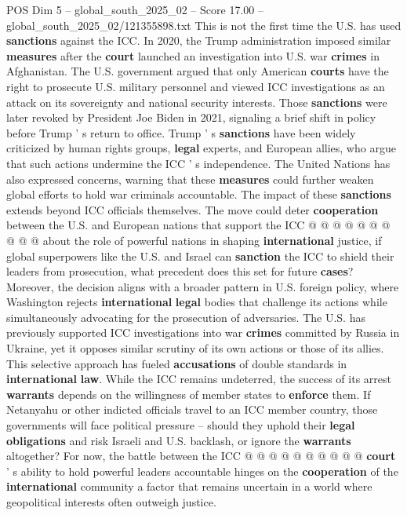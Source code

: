 \begin{textsample}{POS Dim 5 – global\_south\_2025\_02 – Score 17.00 – global\_south\_2025\_02/121355898.txt}
This is not the first time the U.S. has used \textbf{sanctions} against the ICC.
In 2020, the Trump administration imposed similar \textbf{measures} after the \textbf{court} launched an investigation into U.S. war \textbf{crimes} in Afghanistan.
The U.S. government argued that only American \textbf{courts} have the right to prosecute U.S. military personnel and viewed ICC investigations as an attack on its sovereignty and national security interests.
Those \textbf{sanctions} were later revoked by President Joe Biden in 2021, signaling a brief shift in policy before Trump ' s return to office.
Trump ' s \textbf{sanctions} have been widely criticized by human rights groups, \textbf{legal} experts, and European allies, who argue that such actions undermine the ICC ' s independence.
The United Nations has also expressed concerns, warning that these \textbf{measures} could further weaken global efforts to hold war criminals accountable.
The impact of these \textbf{sanctions} extends beyond ICC officials themselves.
The move could deter \textbf{cooperation} between the U.S. and European nations that support the ICC @ @ @ @ @ @ @ @ @ @ about the role of powerful nations in shaping \textbf{international} justice, if global superpowers like the U.S. and Israel can \textbf{sanction} the ICC to shield their leaders from prosecution, what precedent does this set for future \textbf{cases}?
Moreover, the decision aligns with a broader pattern in U.S. foreign policy, where Washington rejects \textbf{international} \textbf{legal} bodies that challenge its actions while simultaneously advocating for the prosecution of adversaries.
The U.S. has previously supported ICC investigations into war \textbf{crimes} committed by Russia in Ukraine, yet it opposes similar scrutiny of its own actions or those of its allies.
This selective approach has fueled \textbf{accusations} of double standards in \textbf{international} \textbf{law}.
While the ICC remains undeterred, the success of its arrest \textbf{warrants} depends on the willingness of member states to \textbf{enforce} them.
If Netanyahu or other indicted officials travel to an ICC member country, those governments will face political pressure -- should they uphold their \textbf{legal} \textbf{obligations} and risk Israeli and U.S. backlash, or ignore the \textbf{warrants} altogether?
For now, the battle between the ICC @ @ @ @ @ @ @ @ @ @ \textbf{court} ' s ability to hold powerful leaders accountable hinges on the \textbf{cooperation} of the \textbf{international} community a factor that remains uncertain in a world where geopolitical interests often outweigh justice.

\end{textsample}

